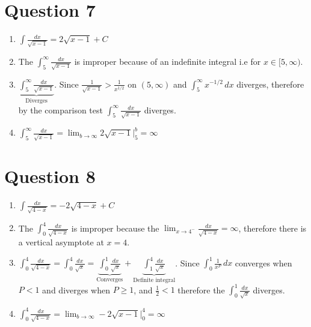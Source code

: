 \documentclass[12pt]{article}
\begin{document}
    \section*{Question 7}
    \begin{enumerate}
        \item $\int \frac{dx}{\sqrt{x-1}} = 2\sqrt{x-1} +C$
        \item The $\int_{5}^{\infty} \frac{dx}{\sqrt{x-1}}$ is improper because of an indefinite integral i.e for \( x\in[5,\infty) \).
        \item $\underbrace{\int_{5}^{\infty} \frac{dx}{\sqrt{x-1}}}_{\text{Diverges}}$. Since $\frac{1}{\sqrt{x-1}} > \frac{1}{x^{1/2}}$ on $(5,\infty)$ and $\int_{5}^{\infty} x^{-1/2} \, dx$ diverges, therefore by the comparison test $\int_{5}^{\infty} \frac{dx}{\sqrt{x-1}}$ diverges.
        \item $\int_{5}^{\infty} \frac{dx}{\sqrt{x-1}} = \lim_{b\to\infty} 2\sqrt{x-1}\biggr\rvert_{5}^{b} = \infty$
    \end{enumerate}
    \section*{Question 8}
    \begin{enumerate}
        \item $\int \frac{dx}{\sqrt{4-x}}=-2\sqrt{4-x}+C$
        \item The $\int_{0}^{4} \frac{dx}{\sqrt{4-x}}$ is improper because the $\lim_{x\to4^-} \frac{dx}{\sqrt{4-x}} = \infty$, therefore there is a vertical asymptote at $x=4$.
        \item $\int_{0}^{4} \frac{dx}{\sqrt{4-x}}= \int_{0}^{4} \frac{dx}{\sqrt{x}} = \underbrace{\int_{0}^{1} \frac{dx}{\sqrt{x}}}_{\text{Converges}} + \underbrace{\int_{1}^{4} \frac{dx}{\sqrt{x}}}_{\text{Definite integral}}$. Since $\int_{0}^{1}\frac{1}{x^P} \, dx$ converges when $P < 1$ and diverges when $P \geq 1$, and $\frac{1}{2} < 1$ therefore the $\int_{0}^{1} \frac{dx}{\sqrt{x}}$ diverges. 
        \item $\int_{0}^{4} \frac{dx}{\sqrt{4-x}}=\lim_{b\to\infty}-2\sqrt{x-1}\biggr\rvert_{0}^{4} = \infty$
    \end{enumerate}
\end{document}
